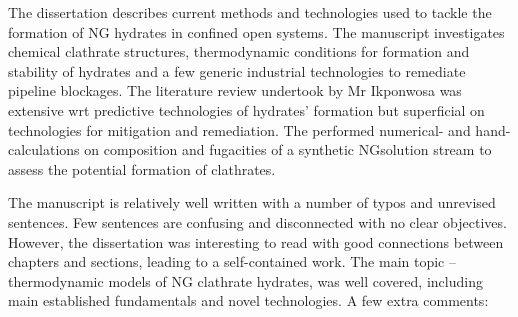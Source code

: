 \documentclass[14pt,twoside]{report}
\begin{document}
\medskip

The dissertation describes current methods and technologies used to tackle the formation of NG hydrates in confined open systems. The manuscript investigates chemical clathrate structures, thermodynamic conditions for formation and stability of hydrates and a few generic industrial technologies to remediate pipeline blockages. The literature review undertook by Mr Ikponwosa was extensive wrt predictive technologies of hydrates' formation but superficial on technologies for mitigation and remediation. The performed numerical- and hand-calculations on composition and fugacities of a synthetic NGsolution stream to assess the potential formation of clathrates.

The manuscript is relatively well written with a number of typos and unrevised sentences. Few sentences are confusing and disconnected with no clear objectives. However, the dissertation was interesting to read with good connections between chapters and sections, leading to a self-contained work. The main topic -- thermodynamic models of NG clathrate hydrates, was well covered, including main established fundamentals and novel technologies. A few extra comments:
\end{document}
